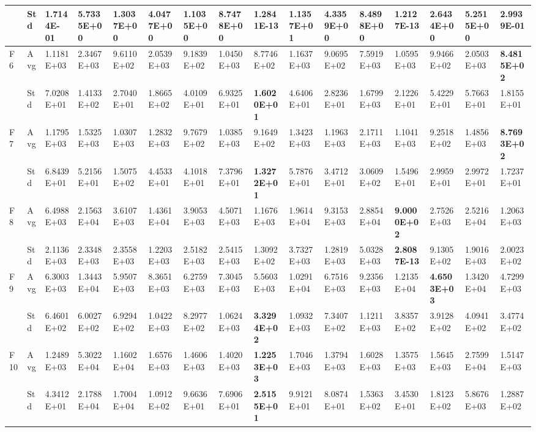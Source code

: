 \documentclass{article} %
\begin{document}
\begin{tabular}{|p{0.3in}|p{0.3in}|p{0.3in}|p{0.3in}|p{0.3in}|p{0.3in}|p{0.3in}|p{0.3in}|p{0.3in}|p{0.3in}|p{0.3in}|p{0.3in}|p{0.3in}|p{0.3in}|p{0.3in}|p{0.5in}|}
 & Std & 1.7144E-01 & 5.7335E+00 & 1.3037E+00 & 4.0477E+00 & 1.1035E+00 & 8.7478E+00 & 1.2841E-13 & 1.1357E+01 & 4.3359E+00 & 8.4898E+00 & \textbf{1.2127E-13} & 2.6434E+00 & 5.2515E+00 & 2.9939E-01 \\ \hline 
F6 & Avg & 1.1181E+03 & 2.3467E+03 & 9.6110E+02 & 2.0539E+03 & 9.1839E+02 & 1.0450E+03 & 8.7746E+02 & 1.1637E+03 & 9.0695E+02 & 7.5919E+03 & 1.0595E+03 & 9.9466E+02 & 2.0503E+03 & \textbf{8.4815E+02} \\ \hline 
 & Std & 7.0208E+01 & 1.4133E+02 & 2.7040E+01 & 1.8665E+02 & 4.0109E+01 & 6.9325E+01 & \textbf{1.6020E+01} & 4.6406E+01 & 2.8236E+01 & 1.6799E+03 & 2.1226E+01 & 5.4229E+01 & 5.7663E+01 & 1.8155E+01 \\ \hline 
F7 & Avg & 1.1795E+03 & 1.5325E+03 & 1.0307E+03 & 1.2832E+03 & 9.7679E+02 & 1.0385E+03 & 9.1649E+02 & 1.3423E+03 & 1.1963E+03 & 2.1711E+03 & 1.1041E+03 & 9.2518E+02 & 1.4856E+03 & \textbf{8.7693E+02} \\ \hline 
 & Std & 6.8439E+01 & 5.2156E+01 & 1.5075E+02 & 4.4533E+01 & 4.1018E+01 & 7.3796E+01 & \textbf{1.3272E+01} & 5.7876E+01 & 3.4712E+01 & 3.0609E+02 & 1.5496E+01 & 2.9959E+01 & 2.9972E+01 & 1.7237E+01 \\ \hline 
F8 & Avg & 6.4988E+03 & 2.1563E+04 & 3.6107E+03 & 1.4361E+04 & 3.9053E+03 & 4.5071E+03 & 1.1676E+03 & 1.9614E+04 & 9.3153E+03 & 2.8854E+04 & \textbf{9.0000E+02} & 2.7526E+03 & 2.5216E+04 & 1.2063E+03 \\ \hline 
 & Std & 2.1136E+03 & 2.3348E+03 & 2.3558E+03 & 1.2203E+03 & 2.5182E+03 & 2.5415E+03 & 1.3092E+02 & 3.7327E+03 & 1.2819E+03 & 5.0328E+03 & \textbf{2.8087E-13} & 9.1305E+02 & 1.9016E+03 & 2.0023E+02 \\ \hline 
F9 & Avg & 6.3003E+03 & 1.3443E+04 & 5.9507E+03 & 8.3651E+03 & 6.2759E+03 & 7.3045E+03 & 5.5603E+03 & 1.0291E+04 & 6.7516E+03 & 9.2356E+03 & 1.2135E+04 & \textbf{4.6503E+03} & 1.3420E+04 & 4.7299E+03 \\ \hline 
 & Std & 6.4601E+02 & 6.0027E+02 & 6.9294E+02 & 1.0422E+03 & 8.2977E+02 & 1.0624E+03 & \textbf{3.3294E+02} & 1.0932E+03 & 7.3407E+02 & 1.1211E+03 & 3.8357E+02 & 3.9128E+02 & 4.0941E+02 & 3.4774E+02 \\ \hline 
F10 & Avg & 1.2489E+03 & 5.3022E+04 & 1.1602E+04 & 1.6576E+03 & 1.4606E+03 & 1.4020E+03 & \textbf{1.2253E+03} & 1.7046E+03 & 1.3794E+03 & 1.6028E+03 & 1.3575E+03 & 1.5645E+03 & 2.7599E+04 & 1.5147E+03 \\ \hline 
 & Std & 4.3412E+01 & 2.1788E+04 & 1.7004E+04 & 1.0912E+02 & 9.6636E+01 & 7.6906E+01 & \textbf{2.5155E+01} & 9.9121E+01 & 8.0874E+01 & 1.5363E+02 & 3.4530E+01 & 1.8123E+02 & 5.8676E+03 & 1.2887E+02 \\ \hline 

\end{tabular}
\end{document}
